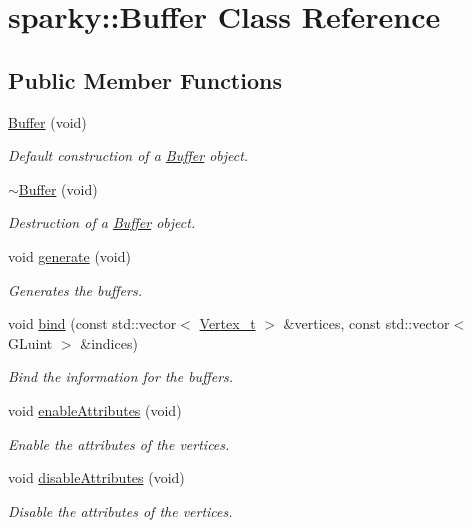 \hypertarget{classsparky_1_1_buffer}{}\section{sparky\+:\+:Buffer Class Reference}
\label{classsparky_1_1_buffer}
\subsection*{Public Member Functions}
\begin{DoxyCompactItemize}
\item 
\hyperlink{classsparky_1_1_buffer_a9e53ed0d9fb0d0cf99f942fd58ce44ca}{Buffer} (void)
\begin{DoxyCompactList}\small\item\em Default construction of a \hyperlink{classsparky_1_1_buffer}{Buffer} object. \end{DoxyCompactList}\item 
\hyperlink{classsparky_1_1_buffer_aa7d9477e0aec95894a96e13313332666}{$\sim$\+Buffer} (void)
\begin{DoxyCompactList}\small\item\em Destruction of a \hyperlink{classsparky_1_1_buffer}{Buffer} object. \end{DoxyCompactList}\item 
void \hyperlink{classsparky_1_1_buffer_ac2aefa244768c2b3a4b50686715e92a5}{generate} (void)
\begin{DoxyCompactList}\small\item\em Generates the buffers. \end{DoxyCompactList}\item 
void \hyperlink{classsparky_1_1_buffer_a915b577135bf0f2a556b4ce4523dbf27}{bind} (const std\+::vector$<$ \hyperlink{structsparky_1_1_vertex__t}{Vertex\+\_\+t} $>$ \&vertices, const std\+::vector$<$ G\+Luint $>$ \&indices)
\begin{DoxyCompactList}\small\item\em Bind the information for the buffers. \end{DoxyCompactList}\item 
void \hyperlink{classsparky_1_1_buffer_aa27f8c14f408ebf91945a5a42ddfacb6}{enable\+Attributes} (void)
\begin{DoxyCompactList}\small\item\em Enable the attributes of the vertices. \end{DoxyCompactList}\item 
void \hyperlink{classsparky_1_1_buffer_abb217d2f0abb7409d40bc1537d0c687e}{disable\+Attributes} (void)
\begin{DoxyCompactList}\small\item\em Disable the attributes of the vertices. \end{DoxyCompactList}\end{DoxyCompactItemize}


